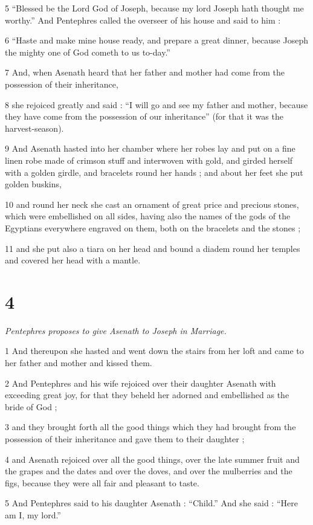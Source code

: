 5 “Blessed be the Lord God of Joseph, because my lord Joseph hath thought me worthy.” And Pentephres called the overseer of his house and said to him : 

6 “Haste and make mine house ready, and prepare a great dinner, because Joseph the mighty one of God cometh to us to-day.” 

7 And, when Asenath heard that her father and mother had come from the possession of their inheritance, 

8 she rejoiced greatly and said : “I will go and see my father and mother, because they have come from the possession of our inheritance” (for that it was the harvest-season). 

9 And Asenath hasted into her chamber where her robes lay and put on a fine linen robe made of crimson stuff and interwoven with gold, and girded herself with a golden girdle, and bracelets round her hands ; and about her feet she put golden buskins, 

10 and round her neck she cast an ornament of great price and precious stones, which were embellished on all sides, having also the names of the gods of the Egyptians everywhere engraved on them, both on the bracelets and the stones ; 

11 and she put also a tiara on her head and bound a diadem round her temples and covered her head with a mantle. 

\chapter{4}

\textit{Pentephres proposes to give Asenath to Joseph in Marriage.}

1 And thereupon she hasted and went down the stairs from her loft and came to her father and mother and kissed them. 

2 And Pentephres and his wife rejoiced over their daughter Asenath with exceeding great joy, for that they beheld her adorned and embellished as the bride of God ; 

3 and they brought forth all the good things which they had brought from the possession of their inheritance and gave them to their daughter ; 

4 and Asenath rejoiced over all the good things, over the late summer fruit and the grapes and the dates and over the doves, and over the mulberries and the figs, because they were all fair and pleasant to taste. 

5 And Pentephres said to his daughter Asenath : “Child.” And she said : “Here am I, my lord.” 


